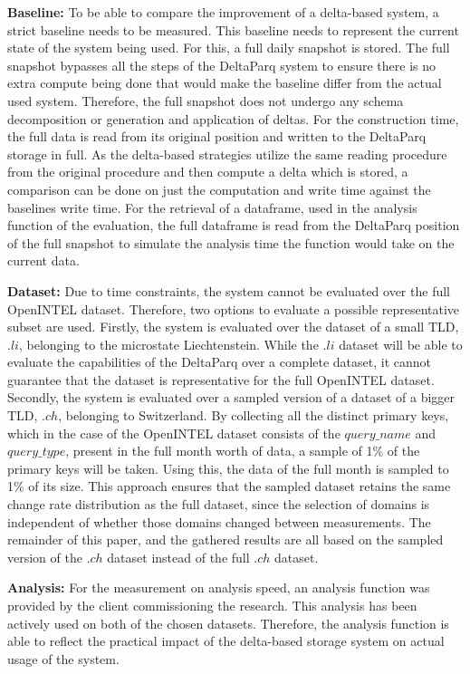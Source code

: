 \textbf{Baseline:}\label{sec:baseline} To be able to compare the improvement of a delta-based system, a strict baseline needs to be measured. This baseline 
needs to represent the current state of the system being used. For this, a full daily snapshot is stored. The full snapshot
bypasses all the steps of the DeltaParq system to ensure there is no extra compute being done that would make the baseline 
differ from the actual used system. Therefore, the full snapshot does not undergo any schema decomposition or generation and 
application of deltas. For the construction time, the full data is read from its original position and written to the DeltaParq 
storage in full. As the delta-based strategies utilize the same reading procedure from the original procedure and then compute 
a delta which is stored, a comparison can be done on just the computation and write time against the baselines write time.
For the retrieval of a dataframe, used in the analysis function of the evaluation, the full dataframe is read from the DeltaParq 
position of the full snapshot to simulate the analysis time the function would take on the current data.

\textbf{Dataset:} Due to time constraints, the system cannot be evaluated over the full OpenINTEL dataset. Therefore, two options to 
evaluate a possible representative subset are used. Firstly, the system is evaluated over the dataset of a small TLD, 
$.li$, belonging to the microstate Liechtenstein. While the $.li$ dataset will be able to evaluate the capabilities of 
the DeltaParq over a complete dataset, it cannot guarantee that the dataset is representative for the full OpenINTEL 
dataset. Secondly, the system is evaluated over a sampled version of a dataset of a bigger TLD, $.ch$, belonging to Switzerland.
By collecting all the distinct primary keys, which in the case of the OpenINTEL dataset consists of the $query\_name$ and $query\_type$, 
present in the full month worth of data, a sample of 1\% of the primary keys will be taken. 
Using this, the data of the full month is sampled to 1\% of its size. This approach ensures that the sampled dataset 
retains the same change rate distribution as the full dataset, since the selection of domains is independent of whether 
those domains changed between measurements. The remainder of this paper, and the gathered results are all based on the sampled version of
the $.ch$ dataset instead of the full $.ch$ dataset.

\textbf{Analysis:} For the measurement on analysis speed, an analysis function was provided by the client commissioning the research. This analysis 
has been actively used on both of the chosen datasets. Therefore, the analysis function is able to reflect the practical impact 
of the delta-based storage system on actual usage of the system.

